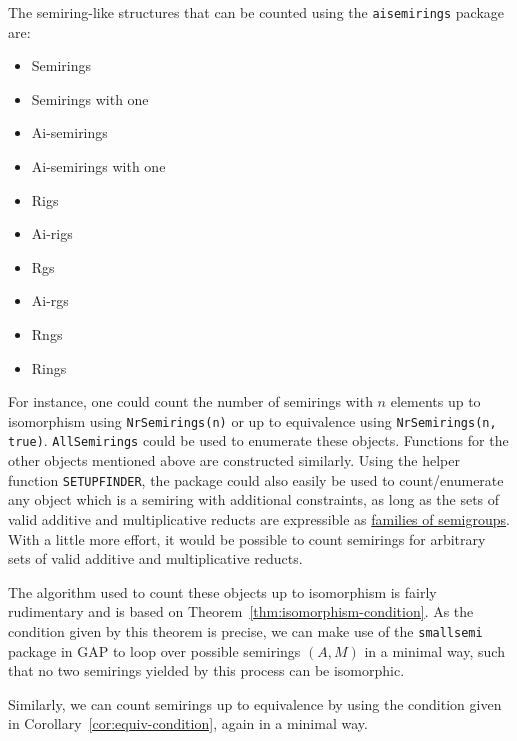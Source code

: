 \documentclass{article}
\theoremstyle{definition}
\theoremstyle{plain}
\begin{document}
The semiring-like structures that can be counted using the
\texttt{aisemirings} package are:

\begin{multicols}{2}
  \begin{itemize}
    \item Semirings
    \item Semirings with one
    \item Ai-semirings
    \item Ai-semirings with one
    \item Rigs
    \item Ai-rigs
    \item Rgs
    \item Ai-rgs
    \item Rngs
    \item Rings
  \end{itemize}
\end{multicols}

For instance, one could count the number of semirings with \(n\)
elements up to isomorphism using \texttt{NrSemirings(n)} or up to
equivalence using \texttt{NrSemirings(n, true)}.
\texttt{AllSemirings} could be used to enumerate these objects.
Functions for the other objects mentioned above are constructed
similarly. Using the helper function \texttt{SETUPFINDER}, the
package could also easily be used to count/enumerate any object which
is a semiring with additional constraints, as long as the sets of
valid additive and multiplicative reducts are expressible as
\href{https://gap-packages.github.io/smallsemi/doc/chap4_mj.html#X82F9C36C86006857}{families
of semigroups}. With a little more effort, it would be possible to
count semirings for arbitrary sets of valid additive and multiplicative reducts.

The algorithm used to count these objects up to isomorphism is fairly
rudimentary and is based on Theorem~\ref{thm:isomorphism-condition}.
As the condition given by this theorem is precise, we can make use of
the \texttt{smallsemi} package in GAP to loop over possible semirings
\((A, M)\) in a minimal way, such that no two semirings yielded by
this process can be isomorphic.

Similarly, we can count semirings up to equivalence by using the
condition given in Corollary~\ref{cor:equiv-condition}, again in a minimal way.
\end{document}

